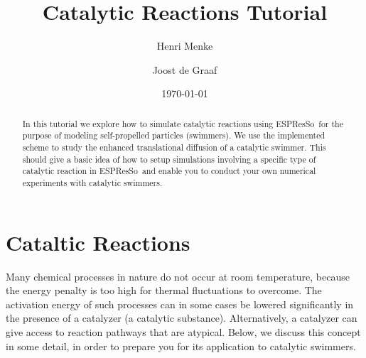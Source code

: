 \documentclass[aip,jcp,reprint,a4paper,onecolumn,nofootinbib,amsmath,amssymb]{revtex4-1}
\newcommand{\es}{\mbox{\textsf{ESPResSo}}\xspace}
\begin{document}
\title{Catalytic Reactions Tutorial}
\author{Henri Menke}
\author{Joost de Graaf}
\date{\today}

\begin{abstract}
  In this tutorial we explore how to simulate catalytic reactions using \es\ for the purpose of modeling self-propelled particles (swimmers). We use the implemented scheme to study the enhanced translational diffusion of a catalytic swimmer. This should give a basic idea of how to setup simulations involving a specific type of catalytic reaction in \es\ and enable you to conduct your own numerical experiments with catalytic swimmers.
\end{abstract}

\maketitle

\section{Cataltic Reactions}

Many chemical processes in nature do not occur at room temperature, because the energy penalty is too high for thermal fluctuations to overcome. The activation energy of such processes can in some cases be lowered significantly in the presence of a catalyzer (a catalytic substance). Alternatively, a catalyzer can give access to reaction pathways that are atypical. Below, we discuss this concept in some detail, in order to prepare you for its application to catalytic swimmers.
\end{document}
